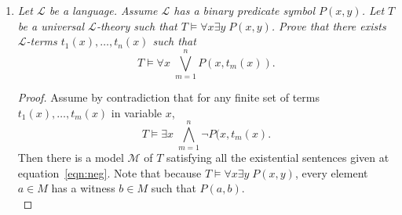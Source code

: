\documentclass{article}
\begin{document}
\begin{enumerate}[label={\bf Q\arabic*:}]
\begin{enumerate}[label={\bf(\arabic*)}]
\begin{proof}
          Now $T_\text{tor-free}$ is $\kappa$-categorical for all
          $\kappa>\omega$ (Theorem 4.35), so since $T_0$ ensures that there
          are no finite-models, $T_\text{tor-free}$ is a complete theory by
          Vaught's test (Theorem 4.34). \\

          Let $\varphi$ be a sentence in the language such that
          $\mathbb{Q}\models\varphi$. Then
          $T_\text{tor-free}\models\varphi$ from completeness of
          $T_\text{tor-free}$, thus from compactness theorem, there must be
          a finite subset of formulas $T_\text{fin}\subset
          T_\text{tor-free}$ such that $T_\text{fin}\models\varphi$.
          Without loss of generality, we can assume
          \begin{align*}
            T_\text{fin} &= T_\text{Ab}\cup \bigcup_{n=1}^N
              \{\underbrace{x+\ldots+x}_{n\text{-times}}=0 \rightarrow
              x=0\} \cup\bigcup_{n=1}^N
              \{\forall x\exists y\;
              \underbrace{y+\ldots+y}_{n\text{-times}}=x\}. \\
          \end{align*}
          Then by choosing prime $p>N$, we will have $\mathbb{Z}_p\models
          T_\text{fin}$. Then $\mathbb{Z}_p\models\varphi$, as required.
        \end{proof}

      \item Write a sentence $\psi$ such that $\mathbb{Z}\models\psi$ and
        $\mathbb{Q}\models\neg\psi$.
        \begin{proof}
          Let $\psi$ be the sentence that says ``There is an element that
          is not divisible by 2''. Formally,
          \[\psi:= \exists x\forall y\; (y+y\neq x).\]
        \end{proof}
    \end{enumerate}

  \item \it Let $\mathcal{L}$ be a language. Assume $\mathcal{L}$ has a
    binary predicate symbol $P(x,y)$. Let $T$ be a universal
    $\mathcal{L}$-theory such that $T\models\forall x\exists y\; P(x,y)$.
    Prove that there exists $\mathcal{L}$-terms $t_1(x),\ldots,t_n(x)$ such
    that \[T\models\forall x\; \bigvee_{m=1}^n P(x,t_m(x)).\]
    \begin{proof}
      Assume by contradiction that for any finite set of terms
      $t_1(x),\ldots,t_m(x)$ in variable $x$,
      \begin{equation}
        \tag{$*$}
        T\models\exists x\; \bigwedge_{m=1}^n \neg P(x,t_m(x).
        \label{eqn:neg}
      \end{equation}
      Then there is a model $\mathcal{M}$ of $T$ satisfying all the
      existential sentences given at equation~\eqref{eqn:neg}. Note that
      because $T\models\forall x\exists y\; P(x,y)$, every element $a\in M$
      has a witness $b\in M$ such that $P(a,b)$. \\


\end{proof}
\end{enumerate}
\end{document}
